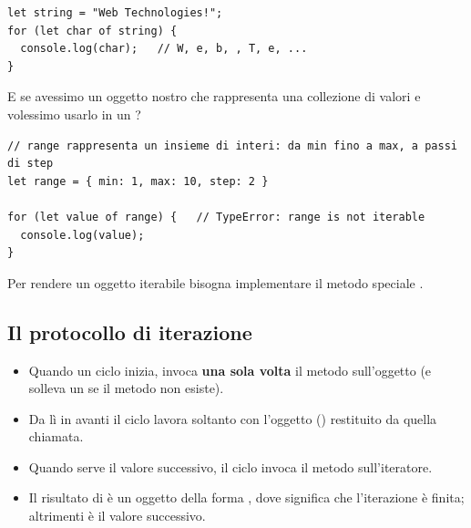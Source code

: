 \begin{affianco}[0.5][c]
\begin{lstlisting}[style=js, name=iterabili.js]
let string = "Web Technologies!";
for (let char of string) {
  console.log(char);   // W, e, b, , T, e, ...
}
\end{lstlisting}
\risultato
\begin{immagine}
\end{immagine}
\end{affianco}

E se avessimo un oggetto nostro che rappresenta una collezione di valori e
volessimo usarlo in un ?

\begin{lstlisting}[style=js, name=range.js]
// range rappresenta un insieme di interi: da min fino a max, a passi di step
let range = { min: 1, max: 10, step: 2 }

for (let value of range) {   // TypeError: range is not iterable
  console.log(value);
}
\end{lstlisting}

Per rendere un oggetto iterabile bisogna implementare il metodo speciale
.

\subsection{Il protocollo di iterazione}

\begin{itemize}
  \item Quando un ciclo  inizia, invoca \textbf{una sola volta} il
        metodo  sull'oggetto (e solleva un
         se il metodo non esiste).
  \item Da lì in avanti il ciclo lavora soltanto con l'oggetto
        () restituito da quella chiamata.
  \item Quando serve il valore successivo, il ciclo invoca il metodo
         sull'iteratore.
  \item Il risultato di  è un oggetto della forma
        , dove  significa
        che l'iterazione è finita; altrimenti  è il valore
        successivo.
\end{itemize}

